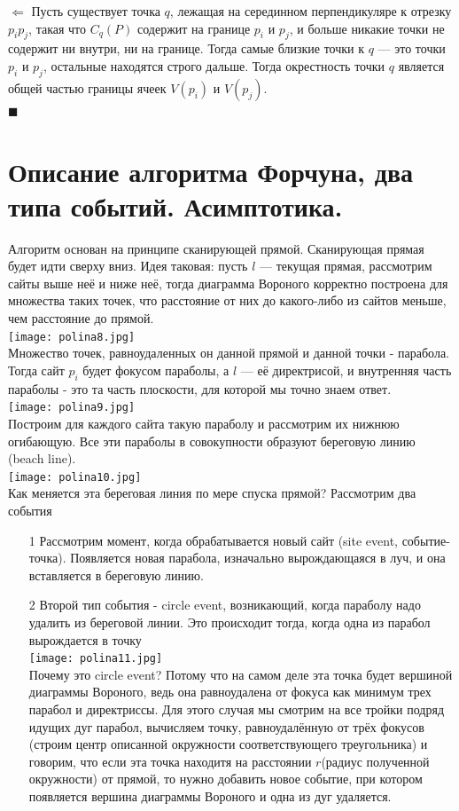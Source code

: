 $\Longleftarrow$ Пусть существует точка $q$, лежащая на серединном перпендикуляре к отрезку $p_i p_j$,  такая что $C_q (P)$ содержит на границе $p_i$ и $p_j$, и больше никакие точки не содержит ни внутри, ни на границе. Тогда самые близкие точки к $q$ — это точки $p_i$ и $p_j$, остальные находятся строго дальше. Тогда окрестность точки $q$ является общей частью границы ячеек $V (p_i)$ и $V (p_j)$.
\\
$\blacksquare$
\newpage{}

\section{Описание алгоритма Форчуна, два типа событий. Асимптотика.}
Алгоритм основан на принципе сканирующей прямой. Сканирующая прямая будет идти сверху вниз. Идея таковая: пусть $l$ — текущая прямая, рассмотрим сайты выше неё и ниже неё, тогда диаграмма Вороного корректно построена для множества таких точек, что расстояние от них до какого-либо из сайтов меньше, чем расстояние до прямой.
\\
\texttt{[image: polina8.jpg]}
\\
Множество точек, равноудаленных он данной прямой и данной точки - парабола. Тогда сайт $p_i$ будет фокусом параболы, а $l$ — её директрисой, и внутренняя часть параболы - это та часть плоскости, для которой мы точно знаем ответ.
\\
\texttt{[image: polina9.jpg]}
\\
Построим для каждого сайта такую параболу и рассмотрим их нижнюю огибающую. Все эти параболы в совокупности образуют береговую линию (beach line). 
\\
\texttt{[image: polina10.jpg]}
\\
Как меняется эта береговая линия по мере спуска прямой? Рассмотрим два события
\begin{itemize}
    \item [1] Рассмотрим момент, когда обрабатывается новый сайт (site event, событие-точка). Появляется новая парабола, изначально вырождающаяся в луч, и она вставляется в береговую линию.
     \item [2] Второй тип события - circle event, возникающий, когда параболу надо удалить из береговой линии. Это происходит тогда, когда одна из парабол вырождается в точку
     \\
\texttt{[image: polina11.jpg]}
\\
Почему это circle event? Потому что на самом деле эта точка будет вершиной диаграммы Вороного, ведь она равноудалена от фокуса как минимум трех парабол и директриссы. Для этого случая мы смотрим на все тройки подряд идущих дуг парабол, вычисляем точку, равноудалённую от трёх фокусов (строим центр описанной окружности соответствующего треугольника) и говорим, что если эта точка находитя на расстоянии $r$(радиус полученной окружности) от прямой, то нужно добавить новое событие, при котором появляется вершина диаграммы Вороного и одна из дуг удаляется.

\end{itemize}
